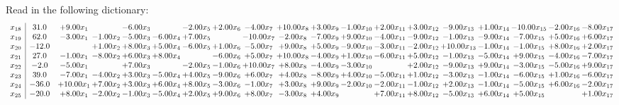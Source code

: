 \documentclass[9pt]{article}
\begin{document}
Read in the following dictionary:
\[\begin{array}{c| c c@{\hskip 2pt} c@{\hskip 2pt} c@{\hskip 2pt} c@{\hskip 2pt} c@{\hskip 2pt} c@{\hskip 2pt} c@{\hskip 2pt} c@{\hskip 2pt} c@{\hskip 2pt} c@{\hskip 2pt} c@{\hskip 2pt} c@{\hskip 2pt} c@{\hskip 2pt} c@{\hskip 2pt} c@{\hskip 2pt} c@{\hskip 2pt} c@{\hskip 2pt} }
 x_{18}   &  31.0 & +  9.00 x_{1} &   & -6.00 x_{3} &   & -2.00 x_{5} & +  2.00 x_{6} & -4.00 x_{7} & + 10.00 x_{8} & +  3.00 x_{9} & -1.00 x_{10} & +  2.00 x_{11} & +  3.00 x_{12} & -9.00 x_{13} & +  1.00 x_{14} & -10.00 x_{15} & -2.00 x_{16} & -8.00 x_{17}\\
 x_{19}   &  62.0 & -3.00 x_{1} & -1.00 x_{2} & -5.00 x_{3} & -6.00 x_{4} & +  7.00 x_{5} &   & -10.00 x_{7} & -2.00 x_{8} & -7.00 x_{9} & +  9.00 x_{10} & -4.00 x_{11} & -9.00 x_{12} & -1.00 x_{13} & -9.00 x_{14} & -7.00 x_{15} & +  5.00 x_{16} & +  6.00 x_{17}\\
 x_{20}   &  -12.0  &   & +  1.00 x_{2} & +  8.00 x_{3} & +  5.00 x_{4} & -6.00 x_{5} & +  1.00 x_{6} & -5.00 x_{7} & +  9.00 x_{8} & +  5.00 x_{9} & -9.00 x_{10} & -3.00 x_{11} & -2.00 x_{12} & + 10.00 x_{13} & -1.00 x_{14} & -1.00 x_{15} & +  8.00 x_{16} & +  2.00 x_{17}\\
 x_{21}   &  27.0 & -1.00 x_{1} & -8.00 x_{2} & +  6.00 x_{3} & +  8.00 x_{4} &   & -6.00 x_{6} & +  5.00 x_{7} & + 10.00 x_{8} & -4.00 x_{9} & +  1.00 x_{10} & -6.00 x_{11} & +  5.00 x_{12} & -1.00 x_{13} & -5.00 x_{14} & +  9.00 x_{15} & -4.00 x_{16} & -7.00 x_{17}\\
 x_{22}   &  -2.0 & -5.00 x_{1} &   & +  7.00 x_{3} &   & -2.00 x_{5} & -1.00 x_{6} & + 10.00 x_{7} & +  8.00 x_{8} & -4.00 x_{9} & -3.00 x_{10} &   & +  2.00 x_{12} & -9.00 x_{13} & +  9.00 x_{14} & -3.00 x_{15} & -5.00 x_{16} & +  9.00 x_{17}\\
 x_{23}   &  39.0 & -7.00 x_{1} & -4.00 x_{2} & +  3.00 x_{3} & -5.00 x_{4} & +  4.00 x_{5} & -9.00 x_{6} & +  6.00 x_{7} & +  4.00 x_{8} & -8.00 x_{9} & +  4.00 x_{10} & -5.00 x_{11} & +  1.00 x_{12} & -3.00 x_{13} & -1.00 x_{14} & -6.00 x_{15} & +  1.00 x_{16} & -6.00 x_{17}\\
 x_{24}   &  -36.0 & + 10.00 x_{1} & +  7.00 x_{2} & +  3.00 x_{3} & +  6.00 x_{4} & +  8.00 x_{5} & -3.00 x_{6} & -1.00 x_{7} & +  3.00 x_{8} & +  9.00 x_{9} & -2.00 x_{10} & -2.00 x_{11} & -1.00 x_{12} & +  2.00 x_{13} & -1.00 x_{14} & -5.00 x_{15} & +  6.00 x_{16} & -2.00 x_{17}\\
 x_{25}   &  -20.0 & +  8.00 x_{1} & -2.00 x_{2} & -1.00 x_{3} & -5.00 x_{4} & +  2.00 x_{5} & +  9.00 x_{6} & +  8.00 x_{7} & -3.00 x_{8} & +  4.00 x_{9} &   & +  7.00 x_{11} & +  8.00 x_{12} & -5.00 x_{13} & +  6.00 x_{14} & +  5.00 x_{15} &   & +  1.00 x_{17}\\

\end{array}\]
\end{document}
